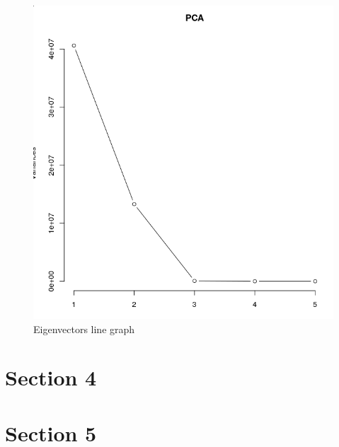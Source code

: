 \documentclass{report}
\begin{document}
\begin{figure}[h!]
	\includegraphics[width=\linewidth]{eigenvectors graph.png}
	 \caption{Eigenvectors line graph}
	\label{fig:eigenvectorslinegraph}
\end{figure}



\chapter{Section 4}

\chapter{Section 5}
\end{document}
